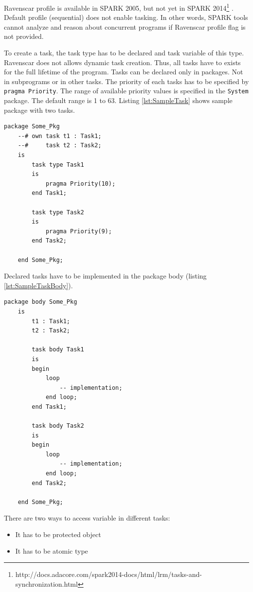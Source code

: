 Ravenscar profile is available in SPARK 2005, but not yet in SPARK 2014\footnote{http://docs.adacore.com/spark2014-docs/html/lrm/tasks-and-synchronization.html} \cite{Spark2014refManual:Online}. Default profile (sequential) does not enable tasking. In other words, SPARK tools cannot analyze and reason about concurrent programs if Ravenscar profile flag is not provided.

To create a task, the task type has to be declared and task variable of this type. Ravenscar does not allows dynamic task creation. Thus, all tasks have to exists for the full lifetime of the program. \cite{IssuesWithRavenscar:Paper} Tasks can be declared only in packages. Not in subprograms or in other tasks. \cite{Barnes:Book} The priority of each tasks has to be specified by \lstinline{pragma Priority}. The range of available priority values is specified in the \lstinline{System} package. The default range is 1 to 63. Listing \ref{lst:SampleTask} shows sample package with two tasks.

\singlespacing
\begin{lstlisting}[frame=single, gobble=0, caption={Sample tasks}]
	package Some_Pkg
	--# own task t1 : Task1;
	--#     task t2 : Task2;
	is
		task type Task1
		is
			pragma Priority(10);
		end Task1;

		task type Task2
		is
			pragma Priority(9);
		end Task2;

	end Some_Pkg;
\end{lstlisting} 
\doublespacing
\label{lst:SampleTask}

Declared tasks have to be implemented in the package body (listing \ref{lst:SampleTaskBody}).

\singlespacing
\begin{lstlisting}[frame=single, gobble=0, caption={Sample tasks body}]
	package body Some_Pkg
	is
		t1 : Task1;
		t2 : Task2;

		task body Task1
		is
		begin
			loop
				-- implementation;
			end loop;
		end Task1;

		task body Task2
		is
		begin
			loop
				-- implementation;
			end loop;
		end Task2;

	end Some_Pkg;
\end{lstlisting} 
\label{lst:SampleTaskBody}
\doublespacing

There are two ways to access variable in different tasks:
\begin{itemize}
    \item It has to be protected object
    \item It has to be atomic type
\end{itemize}

